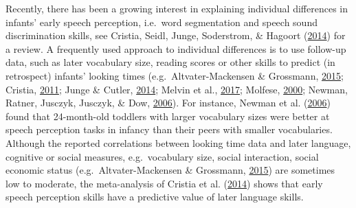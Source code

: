 \documentclass[openright,titlepage,12pt,a4paper]{book}
\begin{document}
Recently, there has been a growing interest in explaining individual differences in infants' early speech perception, i.e.~word segmentation and speech sound discrimination skills, see Cristia, Seidl, Junge, Soderstrom, \& Hagoort (\protect\hyperlink{ref-cristia_predicting_2014}{2014}) for a review. A frequently used approach to individual differences is to use follow-up data, such as later vocabulary size, reading scores or other skills to predict (in retrospect) infants' looking times (e.g.~Altvater-Mackensen \& Grossmann, \protect\hyperlink{ref-altvater-mackensen_learning_2015}{2015}; Cristia, \protect\hyperlink{ref-cristia_fine-grained_2011}{2011}; Junge \& Cutler, \protect\hyperlink{ref-junge_early_2014}{2014}; Melvin et al., \protect\hyperlink{ref-melvin_home_2017}{2017}; Molfese, \protect\hyperlink{ref-molfese_predicting_2000}{2000}; Newman, Ratner, Jusczyk, Jusczyk, \& Dow, \protect\hyperlink{ref-newman_infants_2006}{2006}). For instance, Newman et al. (\protect\hyperlink{ref-newman_infants_2006}{2006}) found that 24-month-old toddlers with larger vocabulary sizes were better at speech perception tasks in infancy than their peers with smaller vocabularies. Although the reported correlations between looking time data and later language, cognitive or social measures, e.g.~vocabulary size, social interaction, social economic status (e.g.~Altvater-Mackensen \& Grossmann, \protect\hyperlink{ref-altvater-mackensen_learning_2015}{2015}) are sometimes low to moderate, the meta-analysis of Cristia et al. (\protect\hyperlink{ref-cristia_predicting_2014}{2014}) shows that early speech perception skills have a predictive value of later language skills.
\end{document}
